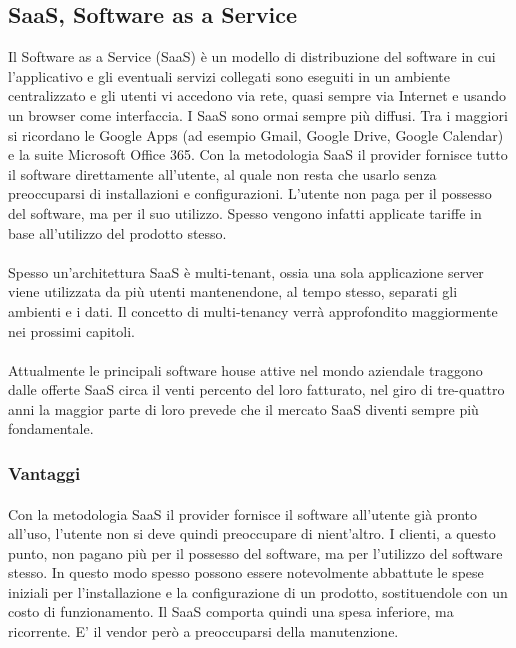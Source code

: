\subsection{SaaS, Software as a Service}

Il Software as a Service (SaaS) è un modello di distribuzione del software in cui l'applicativo e gli eventuali servizi collegati sono eseguiti in un ambiente centralizzato e gli utenti vi accedono via rete, quasi sempre via Internet e usando un browser come interfaccia. I SaaS sono ormai sempre più diffusi. Tra i maggiori si ricordano le Google Apps (ad esempio Gmail, Google Drive, Google Calendar) e la suite Microsoft Office 365. Con la metodologia SaaS il provider fornisce tutto il software direttamente all'utente, al quale non resta che usarlo senza preoccuparsi di installazioni e configurazioni. L'utente non paga per il possesso del software, ma per il suo utilizzo. Spesso vengono infatti applicate tariffe in base all'utilizzo del prodotto stesso. 

\paragraph{}
Spesso un'architettura SaaS è multi-tenant, ossia una sola applicazione server viene utilizzata da più utenti mantenendone, al tempo stesso, separati gli ambienti e i dati. Il concetto di multi-tenancy verrà approfondito maggiormente nei prossimi capitoli.
\paragraph{}
Attualmente le principali software house attive nel mondo aziendale traggono dalle offerte SaaS circa il venti percento del loro fatturato, nel giro di tre-quattro anni la maggior parte di loro prevede che il mercato SaaS diventi sempre più fondamentale.

\subsubsection{Vantaggi}
\paragraph{}
Con la metodologia SaaS il provider fornisce il software all'utente già pronto all'uso, l'utente non si deve quindi preoccupare di nient'altro. I clienti, a questo punto, non pagano più per il possesso del software, ma per l'utilizzo del software stesso. In questo modo spesso possono essere notevolmente abbattute le spese iniziali per l'installazione e la configurazione di un prodotto, sostituendole con un costo di funzionamento. Il SaaS comporta quindi una spesa inferiore, ma ricorrente. E' il vendor però a preoccuparsi della manutenzione.
